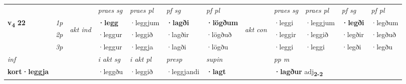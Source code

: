 \begin{longtable}[l]{X>{\footnotesize\itshape}llXXXXlXXXX}
 & &   & \textit{praes sg}  & \textit{praes pl}    & \textit{ pf sg} & \textit{pf pl} & & \textit{praes sg}  & \textit{praes pl}    & \textit{pf sg} & \textit{pf pl }  \\ \cmidrule{4-7} \cmidrule{9-12}
 \multirow{2}{*}{{{\textbf{v{\textsubscript{4}}} \Large{\textbf{22}}}}}  & 1p & \multirow{3}{*}{\begin{turn}{90}\textit{akt ind}\end{turn}} & \textbf{·legg} & ·leggjum & \textbf{·lagði} & \textbf{·lögðum} & \multirow{3}{*}{\begin{turn}{90}\textit{akt con}\end{turn}} &·leggi & ·leggjum & \textbf{·legði} & ·legðum\\*
 & 2p &  &  ·leggur  & ·leggið & ·lagðir & ·lögðuð & & ·leggir & ·leggið & ·legðir & ·legðuð \\*
 & 3p &  & ·leggur & ·leggja & ·lagði & ·lögðu & & ·leggi & ·leggi& ·legði & ·legðu \\*
\cmidrule{4-7} \cmidrule{9-12}

   {\textit{inf}} & &  & \textit{i akt sg} & \textit{i akt pl}   & \textit{presp} & \textit{supin}  && \textit{pp m} \\*
  {\textbf{kort\allowbreak ·leggja}} & && ·leggðu  & ·leggið   & ·leggjandi &  \textbf{·lagt}  && \multicolumn{2}{l}{\textbf{·lagður} adj\textbf{\textsubscript{2-2}}} \\*


\end{longtable}
